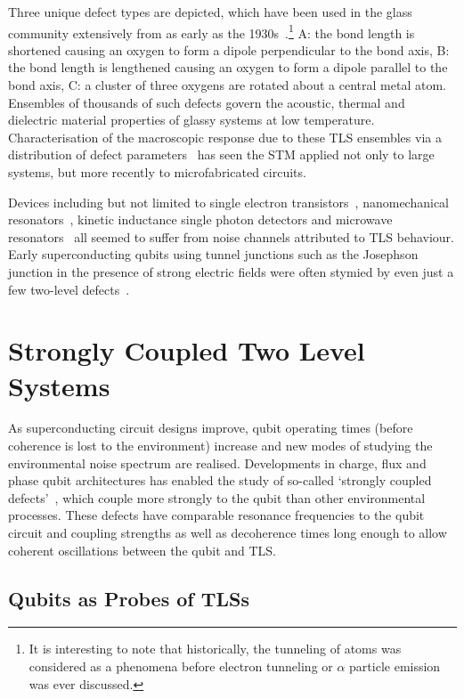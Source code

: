 Three unique defect types are depicted, which have been used in the glass community extensively from as early as the 1930s~\cite{Zachariasen1932}.\footnote{It is interesting to note that historically, the tunneling of atoms was considered as a phenomena before electron tunneling or $\alpha$ particle emission was ever discussed.}
A: the bond length is shortened causing an oxygen to form a dipole perpendicular to the bond axis, B: the bond length is lengthened causing an oxygen to form a dipole parallel to the bond axis, C: a cluster of three oxygens are rotated about a central metal atom.
Ensembles of thousands of such defects govern the acoustic, thermal and dielectric material properties of glassy systems at low temperature.
Characterisation of the macroscopic response due to these TLS ensembles via a distribution of defect parameters~\cite{Enss2005} has seen the STM applied not only to large systems, but more recently to microfabricated circuits.

Devices including but not limited to single electron transistors~\cite{Zimmerli1992}, nanomechanical resonators~\cite{Ahn2003}, kinetic inductance single photon detectors and microwave resonators~\cite{Gao2007} all seemed to suffer from noise channels attributed to TLS behaviour.
Early superconducting qubits using tunnel junctions such as the Josephson junction in the presence of strong electric fields were often stymied by even just a few two-level defects~\cite{Simmonds2004}.

\section{Strongly Coupled Two Level Systems}

As superconducting circuit designs improve, qubit operating times (before coherence is lost to the environment) increase and new modes of studying the environmental noise spectrum are realised.
Developments in charge, flux and phase qubit architectures has enabled the study of so-called `strongly coupled defects'~\cite{Neeley2008, Lupascu2009, Lisenfeld2010}, which couple more strongly to the qubit than other environmental processes.
These defects have comparable resonance frequencies to the qubit circuit and coupling strengths as well as decoherence times long enough to allow coherent oscillations between the qubit and TLS.

\subsection{Qubits as Probes of TLSs}\label{sec:probes}

